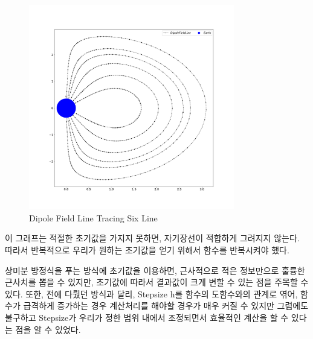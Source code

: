 \documentclass[11pt]{article}
\begin{document}
\begin{figure}[!ht]
  \centering
  \includegraphics[width=0.8\textwidth]{Electric2.pdf}
  \caption{Dipole Field Line Tracing Six Line}
\end{figure} 
이 그래프는 적절한 초기값을 가지지 못하면, 자기장선이 적합하게 그려지지 않는다. 따라서 반복적으로 우리가 원하는 초기값을 얻기 위해서 함수를 반복시켜야 했다. 

상미분 방정식을 푸는 방식에 초기값을 이용하면, 근사적으로 적은 정보만으로 훌륭한 근사치를 뽑을 수 있지만, 초기값에 따라서 결과값이 크게 변할 수 있는 점을 주목할 수 있다. 또한, 전에 다뤘던 방식과 달리, Stepsize h를 함수의 도함수와의 관계로 엮어, 함수가 급격하게 증가하는 경우 계산처리를 해야할 경우가 매우 커질 수 있지만 그럼에도 불구하고 Stepsize가 우리가 정한 범위 내에서 조정되면서 효율적인 계산을 할 수 있다는 점을 알 수 있었다.
\end{document}

